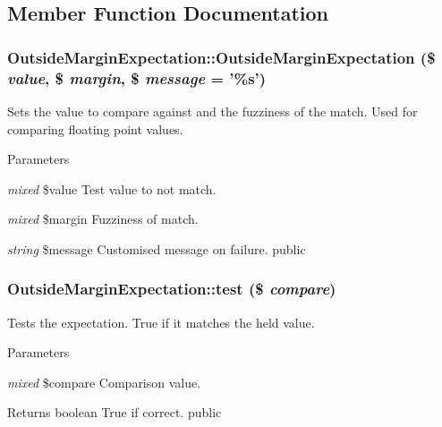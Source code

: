 \subsection{Member Function Documentation}
\hypertarget{class_outside_margin_expectation_a1413a72a816e6d5b0bbcc0895cbe6f12}{
\subsubsection[{OutsideMarginExpectation}]{\setlength{\rightskip}{0pt plus 5cm}OutsideMarginExpectation::OutsideMarginExpectation (\$ {\em value}, \/  \$ {\em margin}, \/  \$ {\em message} = {\ttfamily '\%s'})}}
\label{class_outside_margin_expectation_a1413a72a816e6d5b0bbcc0895cbe6f12}
Sets the value to compare against and the fuzziness of the match. Used for comparing floating point values. 
\begin{DoxyParams}{Parameters}
\item[{\em mixed}]\$value Test value to not match. \item[{\em mixed}]\$margin Fuzziness of match. \item[{\em string}]\$message Customised message on failure.  public \end{DoxyParams}
\hypertarget{class_outside_margin_expectation_a6c68e08230af88b7cf33445bbc2ff24f}{
\subsubsection[{test}]{\setlength{\rightskip}{0pt plus 5cm}OutsideMarginExpectation::test (\$ {\em compare})}}
\label{class_outside_margin_expectation_a6c68e08230af88b7cf33445bbc2ff24f}
Tests the expectation. True if it matches the held value. 
\begin{DoxyParams}{Parameters}
\item[{\em mixed}]\$compare Comparison value. \end{DoxyParams}
\begin{DoxyReturn}{Returns}
boolean True if correct.  public 
\end{DoxyReturn}


